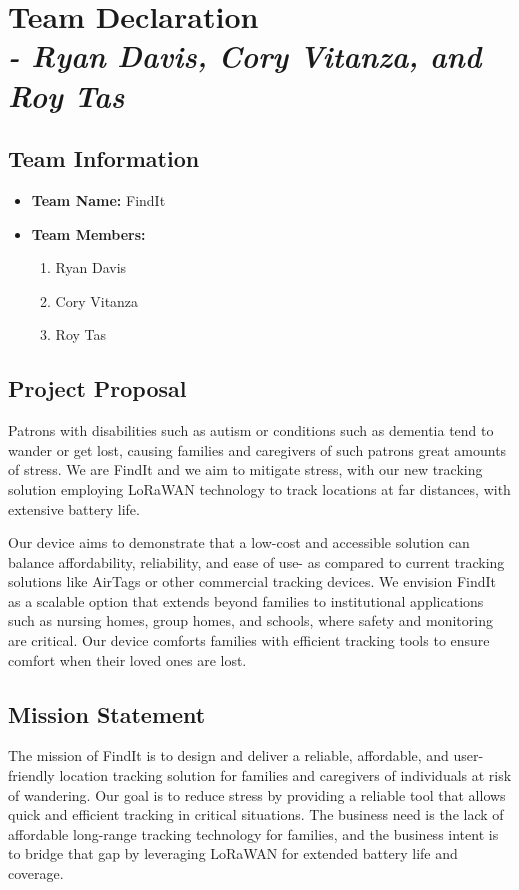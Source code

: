 \chapter{Team Declaration \\ 
\small{\textit{- Ryan Davis, Cory Vitanza, and Roy Tas}}}
\label{Chapter::TeamDeclaration}

\section{Team Information}
\begin{itemize}
    \item \textbf{Team Name:} FindIt
    \item \textbf{Team Members:} 
    \begin{enumerate}
        \item Ryan Davis
        \item Cory Vitanza
        \item Roy Tas
    \end{enumerate}
\end{itemize}

\section{Project Proposal}
Patrons with disabilities such as autism or conditions such as dementia tend to wander or get lost, causing families and caregivers of such patrons great amounts of stress. We are FindIt and we aim to mitigate stress, with our new tracking solution employing \gls{LoRaWAN} technology to track locations at far distances, with extensive battery life.

Our device aims to demonstrate that a low-cost and accessible solution can balance affordability, reliability, and ease of use- as compared to current tracking solutions like AirTags or other commercial tracking devices. We envision FindIt as a scalable option that extends beyond families to institutional applications such as nursing homes, group homes, and schools, where safety and monitoring are critical. Our device comforts families with efficient tracking tools to ensure comfort when their loved ones are lost.

\section{Mission Statement}
The mission of FindIt is to design and deliver a reliable, affordable, and user-friendly location tracking solution for families and caregivers of individuals at risk of wandering. Our goal is to reduce stress by providing a reliable tool that allows quick and efficient tracking in critical situations. The business need is the lack of affordable long-range tracking technology for families, and the business intent is to bridge that gap by leveraging LoRaWAN for extended battery life and coverage.

